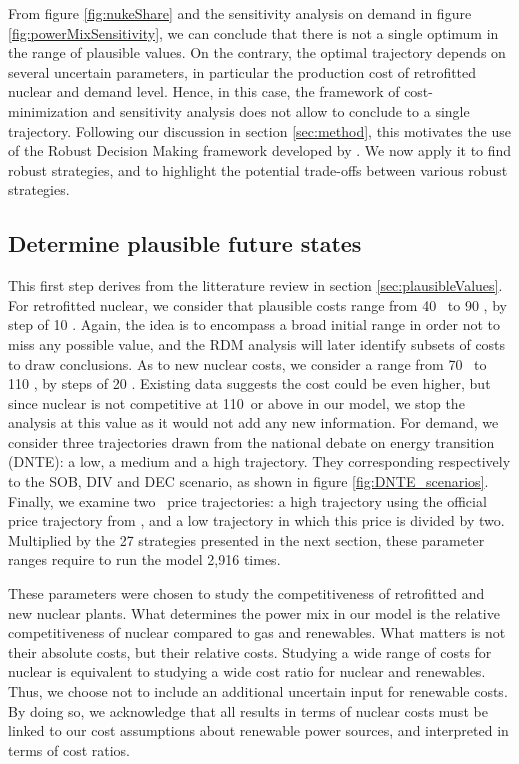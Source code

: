 From figure \ref{fig:nukeShare} and the sensitivity analysis on demand in figure \ref{fig:powerMixSensitivity}, we can conclude that there is not a single optimum in the range of plausible values. On the contrary, the optimal trajectory depends on several uncertain parameters, in particular the production cost of retrofitted nuclear and demand level. Hence, in this case, the framework of cost-minimization and sensitivity analysis does not allow to conclude to a single trajectory. Following our discussion in section \ref{sec:method}, this motivates the use of the Robust Decision Making framework developed by \citet{Lempert2006}. We now apply it to find robust strategies, and to highlight the potential trade-offs between various robust strategies.

\subsection{Determine plausible future states}

This first step derives from the litterature review in section \ref{sec:plausibleValues}. 
For retrofitted nuclear, we consider that plausible costs range from 40 \emwh\ to 90 \emwh, by step of 10 \emwh. Again, the idea is to encompass a broad initial range in order not to miss any possible value, and the RDM analysis will later identify subsets of costs to draw conclusions. 
As to new nuclear costs, we consider a range from 70 \emwh\ to 110 \emwh, by steps of 20 \emwh. Existing data suggests the cost could be even higher, but since nuclear is not competitive at 110\emwh\ or above in our model, we stop the analysis at this value as it would not add any new information.
For demand, we consider three trajectories drawn from the national debate on energy transition (DNTE): a low, a medium and a high trajectory. They corresponding respectively to the SOB, DIV and DEC scenario, as shown in figure \ref{fig:DNTE_scenarios}.
Finally, we examine two \coo\ price trajectories: a high trajectory using the official price trajectory from \citet{Quinet2009}, and a low trajectory in which this price is divided by two.
Multiplied by the 27 strategies presented in the next section, these parameter ranges require to run the model 2,916 times. 

These parameters were chosen to study the competitiveness of retrofitted and new nuclear plants. What determines the power mix in our model is the relative competitiveness of nuclear compared to gas and renewables. What matters is not their absolute costs, but their relative costs.
Studying a wide range of costs for nuclear is equivalent to studying a wide cost ratio for nuclear and renewables.
Thus, we choose not to include an additional uncertain input for renewable costs. By doing so, we acknowledge that all results in terms of nuclear costs must be linked to our cost assumptions about renewable power sources, and interpreted in terms of cost ratios.


